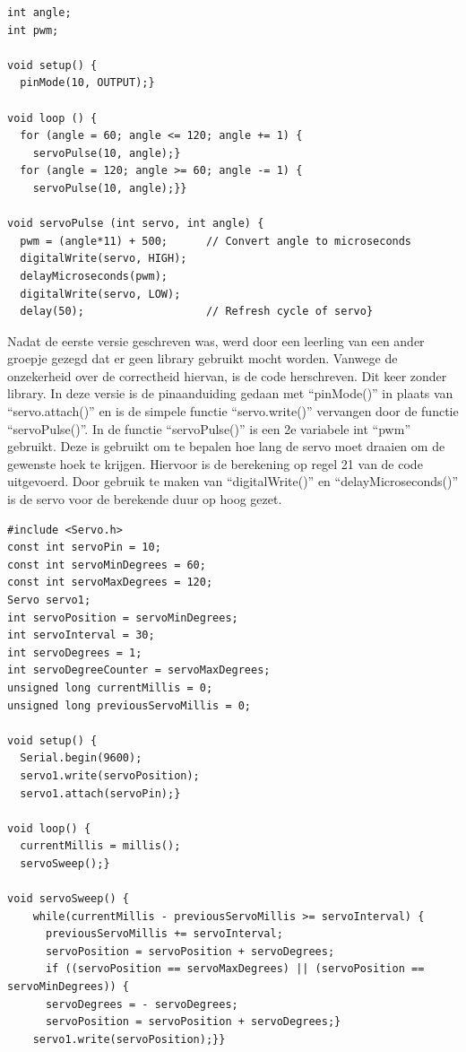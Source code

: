 \begin{lstlisting}
int angle;
int pwm;

void setup() {
  pinMode(10, OUTPUT);}

void loop () {
  for (angle = 60; angle <= 120; angle += 1) {
    servoPulse(10, angle);}
  for (angle = 120; angle >= 60; angle -= 1) {
    servoPulse(10, angle);}}
  
void servoPulse (int servo, int angle) {
  pwm = (angle*11) + 500;      // Convert angle to microseconds
  digitalWrite(servo, HIGH);
  delayMicroseconds(pwm);
  digitalWrite(servo, LOW);
  delay(50);                   // Refresh cycle of servo}
\end{lstlisting}

Nadat de eerste versie geschreven was, werd door een leerling van een ander groepje gezegd dat er geen library gebruikt mocht worden. Vanwege de onzekerheid over de correctheid hiervan, is de code herschreven.  Dit keer zonder library\cite{Aansturen-servo-zonder-library}. In deze versie is de pinaanduiding gedaan met “pinMode()” in plaats van “servo.attach()” en is de simpele functie “servo.write()” vervangen door de functie “servoPulse()”. In de functie “servoPulse()” is een 2e variabele int “pwm” gebruikt. Deze is gebruikt om te bepalen hoe lang de servo moet draaien om de gewenste hoek te krijgen. Hiervoor is de berekening op regel 21 van de code uitgevoerd. Door gebruik te maken van “digitalWrite()” en “delayMicroseconds()” is de servo voor de berekende duur op hoog gezet. 

\begin{lstlisting}
#include <Servo.h>
const int servoPin = 10; 
const int servoMinDegrees = 60; 
const int servoMaxDegrees = 120;
Servo servo1;
int servoPosition = servoMinDegrees;    
int servoInterval = 30; 
int servoDegrees = 1;       
int servoDegreeCounter = servoMaxDegrees;
unsigned long currentMillis = 0;    
unsigned long previousServoMillis = 0; 

void setup() {
  Serial.begin(9600);  
  servo1.write(servoPosition); 
  servo1.attach(servoPin);}

void loop() {
  currentMillis = millis();
  servoSweep();}

void servoSweep() {
    while(currentMillis - previousServoMillis >= servoInterval) {
      previousServoMillis += servoInterval;
      servoPosition = servoPosition + servoDegrees; 
      if ((servoPosition == servoMaxDegrees) || (servoPosition == servoMinDegrees)) {
      servoDegrees = - servoDegrees; 
      servoPosition = servoPosition + servoDegrees;}  
    servo1.write(servoPosition);}}
\end{lstlisting}

